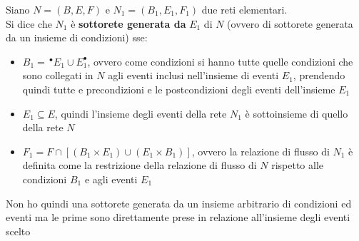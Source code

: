 \documentclass[a4paper,12pt, oneside]{book}
\begin{document}
\begin{definizione}
  Siano $N=(B,E,F)$ e $N_1=(B_1,E_1,F_1)$ due reti elementari.\\
  Si dice che $N_1$ è \textbf{sottorete generata da} $E_1$ di $N$ (ovvero di
  sottorete generata da un insieme di condizioni) sse:
  \begin{itemize}
    \item $B_1=\,^\bullet E_1\cup E_1^\bullet$, ovvero come condizioni si
    hanno tutte quelle condizioni che sono collegati in $N$ agli eventi inclusi
    nell'insieme di eventi $E_1$, prendendo quindi tutte e precondizioni e le
    postcondizioni degli eventi dell'insieme $E_1$
    \item $E_1\subseteq E$, quindi l'insieme degli eventi della rete $N_1$
    è sottoinsieme di quello della rete $N$
    \item $F_1=F\cap[(B_1\times E_1)\cup (E_1\times B_1)]$, ovvero la relazione
    di flusso di $N_1$ è definita come la restrizione della relazione di flusso
    di $N$ rispetto alle condizioni $B_1$ e agli eventi $E_1$
  \end{itemize}
  Non ho quindi una sottorete generata da un insieme arbitrario di condizioni ed
  eventi ma le prime sono direttamente prese in relazione all'insieme degli
  eventi scelto
\end{definizione}
\newpage
\end{document}
